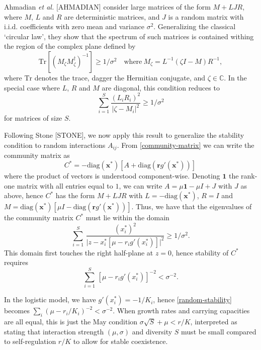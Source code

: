 \documentclass[12pt]{article}
\begin{document}
Ahmadian \emph{et al.} [AHMADIAN] consider large matrices of the form $M + LJR$, where $M$,  $L$ and $R$ are deterministic matrices, and $J$ is a random matrix with i.i.d. coefficients with zero mean and variance $\sigma^2$. Generalizing the classical `circular law', they show that the spectrum of such matrices is contained withing the region of the complex plane defined by 
\begin{equation}
    \textrm{Tr}[(M_\zeta M_\zeta^\dagger)^{-1}]\geq 1/\sigma^2 \quad \textrm{where}\ M_\zeta = L^{-1}(\zeta I - M)R^{-1}, 
\end{equation}
where $\textrm{Tr}$ denotes the trace, dagger the Hermitian conjugate, and $\zeta\in\mathbb{C}$. In the special case where $L$, $R$ and $M$ are diagonal, this condition reduces to
\begin{equation}
    \sum_{i=1}^S\frac{(L_{i}R_{i})^2}{ \vert \zeta - M_{i}\vert^2 }\geq 1/\sigma^2
\end{equation}
for matrices of size $S$. 

Following Stone [STONE], we now apply this result to generalize the stability condition to random interactions $A_{ij}$. From \eqref{community-matrix} we can write the community matrix as
\begin{equation}
    C^* = -\textrm{diag}(\mathbf x^*)[A + \textrm{diag}(\mathbf r  g'( \mathbf x^*))]\,
\end{equation}
where the product of vectors is understood component-wise. Denoting $\mathbf{1}$ the rank-one matrix with all entries equal to $1$, we can write $A = \mu \mathbf{1} - \mu I + J$ with $J$ as above, hence $C^*$ has the form $M + LJR$ with  
$L = -\textrm{diag}(\mathbf x^*)$, $R = I$ and $M = \textrm{diag}(\mathbf x^*)[\mu I - \textrm{diag}(\mathbf r g'(\mathbf x^*))]$. Thus, we have that the eigenvalues of the community matrix $C^*$ must lie within the domain 
\begin{equation}
    \sum_{i=1}^S\, \frac{(x_i^*)^2}{\vert z -x_i^*[\mu - r_ig'(x_i^*)]\vert ^2}\geq 1/\sigma^2. 
\end{equation} 
This domain first touches the right half-plane at $z = 0$, hence stability of $C^*$ requires   
\begin{equation}\label{random-stability}
    \sum_{i=1}^S\, [\mu - r_ig'(x_i^*)]^{-2}< \sigma^{-2}. 
\end{equation}

In the logistic model, we have $g'(x^*_i) = -1/K_i$, hence \eqref{random-stability} becomes $\sum_i (\mu - r_i/K_i)^{-2} < \sigma^{-2}$. When growth rates and carrying capacities are all equal, this is just the May condition $\sigma\sqrt{S} + \mu < r/K$, interpreted as stating that interaction strength $(\mu, \sigma)$ and diversity $S$ must be small compared to self-regulation $r/K$ to allow for stable coexistence.
\end{document}
